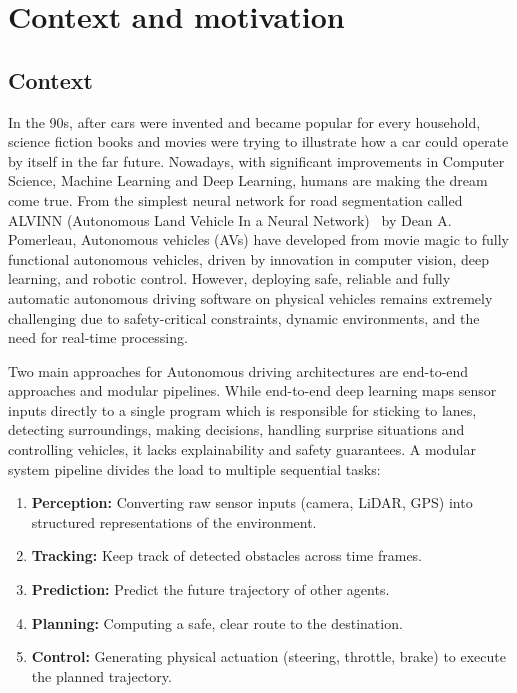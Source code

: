 \documentclass[11pt,a4paper]{report}
\begin{document}
\section{Context and motivation}
\label{sec:context}
\subsection{Context}
In the 90s, after cars were invented and became popular for every household, science fiction books and movies were trying to illustrate how a car could operate by itself in the far future. Nowadays, with significant improvements in Computer Science, Machine Learning and Deep Learning, humans are making the dream come true. From the simplest neural network for road segmentation called ALVINN (Autonomous Land Vehicle In a Neural Network)~\cite{alvinn1989} by Dean A. Pomerleau, Autonomous vehicles (AVs) have developed from movie magic to fully functional autonomous vehicles, driven by innovation in computer vision, deep learning, and robotic control. However, deploying safe, reliable and fully automatic autonomous driving software on physical vehicles remains extremely challenging due to safety-critical constraints, dynamic environments, and the need for real-time processing.

Two main approaches for Autonomous driving architectures are end-to-end approaches and modular pipelines. While end-to-end deep learning maps sensor inputs directly to a single program which is responsible for sticking to lanes, detecting surroundings, making decisions, handling surprise situations and controlling vehicles, it lacks explainability and safety guarantees. A modular system pipeline divides the load to multiple sequential tasks:
\begin{enumerate}
    \item \textbf{Perception:} Converting raw sensor inputs (camera, LiDAR, GPS) into structured representations of the environment.
    \item \textbf{Tracking:} Keep track of detected obstacles across time frames.
    \item \textbf{Prediction:} Predict the future trajectory of other agents.
    \item \textbf{Planning:} Computing a safe, clear route to the destination.
    \item \textbf{Control:} Generating physical actuation (steering, throttle, brake) to execute the planned trajectory.
\end{enumerate}
\end{document}

